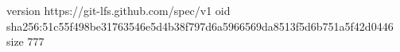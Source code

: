 version https://git-lfs.github.com/spec/v1
oid sha256:51c55f498be31763546e5d4b38f797d6a5966569da8513f5d6b751a5f42d0446
size 777
